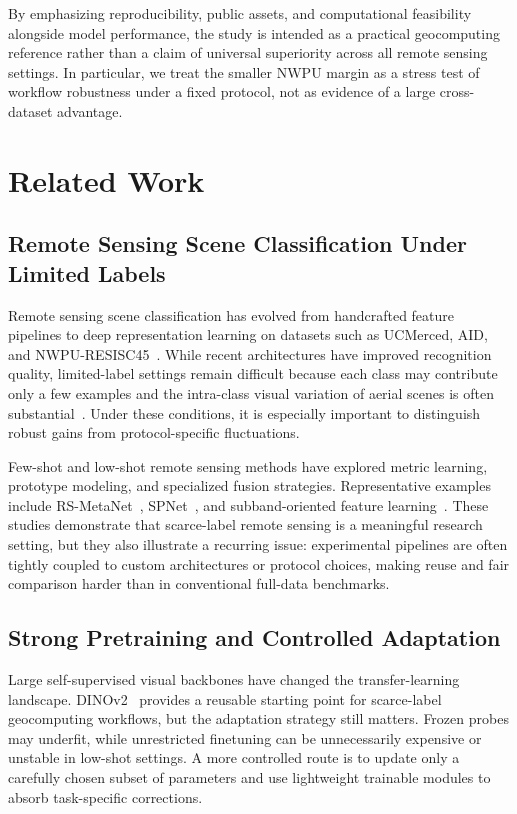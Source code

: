 \documentclass[a4paper,fleqn]{cas-sc}
\begin{document}
By emphasizing reproducibility, public assets, and computational feasibility alongside model performance, the study is intended as a practical geocomputing reference rather than a claim of universal superiority across all remote sensing settings. In particular, we treat the smaller NWPU margin as a stress test of workflow robustness under a fixed protocol, not as evidence of a large cross-dataset advantage.

\section{Related Work}
\label{sec:related_work}

\subsection{Remote Sensing Scene Classification Under Limited Labels}

Remote sensing scene classification has evolved from handcrafted feature pipelines to deep representation learning on datasets such as UCMerced, AID, and NWPU-RESISC45~\cite{yang2010ucm,xia2017aid,cheng2017nwpu,cheng2017survey}. While recent architectures have improved recognition quality, limited-label settings remain difficult because each class may contribute only a few examples and the intra-class visual variation of aerial scenes is often substantial~\cite{thapa2023review}. Under these conditions, it is especially important to distinguish robust gains from protocol-specific fluctuations.

Few-shot and low-shot remote sensing methods have explored metric learning, prototype modeling, and specialized fusion strategies. Representative examples include RS-MetaNet~\cite{li2021rsmetanet}, SPNet~\cite{cheng2022spnet}, and subband-oriented feature learning~\cite{yang2023fewshotsubband}. These studies demonstrate that scarce-label remote sensing is a meaningful research setting, but they also illustrate a recurring issue: experimental pipelines are often tightly coupled to custom architectures or protocol choices, making reuse and fair comparison harder than in conventional full-data benchmarks.

\subsection{Strong Pretraining and Controlled Adaptation}

Large self-supervised visual backbones have changed the transfer-learning landscape. DINOv2~\cite{oquab2023dinov2} provides a reusable starting point for scarce-label geocomputing workflows, but the adaptation strategy still matters. Frozen probes may underfit, while unrestricted finetuning can be unnecessarily expensive or unstable in low-shot settings. A more controlled route is to update only a carefully chosen subset of parameters and use lightweight trainable modules to absorb task-specific corrections.
\end{document}
